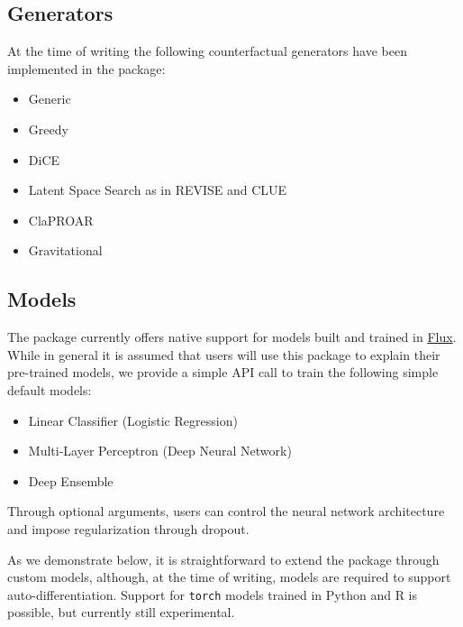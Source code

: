 \documentclass{juliacon}
\begin{document}
\hypertarget{generators}{%
\subsection{Generators}\label{generators}}

At the time of writing the following counterfactual generators have been
implemented in the package:

\begin{itemize}
\item Generic \cite{wachter2017counterfactual}
\item Greedy \cite{schut2021generating}
\item DiCE \cite{mothilal2020explaining}
\item Latent Space Search as in REVISE \cite{joshi2019realistic} and CLUE \cite{antoran2020getting}
\item ClaPROAR \cite{altmeyer2023endogenous}
\item Gravitational \cite{altmeyer2023endogenous}
\end{itemize}

\hypertarget{models}{%
\subsection{Models}\label{models}}

The package currently offers native support for models built and trained
in \href{https://fluxml.ai/}{Flux}. While in general it is assumed that
users will use this package to explain their pre-trained models, we
provide a simple API call to train the following simple default models:

\begin{itemize}
\item Linear Classifier (Logistic Regression)
\item Multi-Layer Perceptron (Deep Neural Network)
\item Deep Ensemble \cite{lakshminarayanan2016simple}
\end{itemize}

Through optional arguments, users can control the neural network
architecture and impose regularization through dropout.

As we demonstrate below, it is straightforward to extend the package
through custom models, although, at the time of writing, models are
required to support auto-differentiation. Support for \texttt{torch}
models trained in Python and R is possible, but currently still
experimental.
\end{document}
